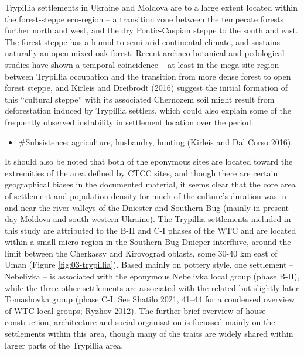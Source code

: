\documentclass[
  12pt,
  a4paper, twoside]{book}
\providecommand{\tightlist}{%
  \setlength{\itemsep}{0pt}\setlength{\parskip}{0pt}}
\begin{document}
Trypillia settlements in Ukraine and Moldova are to a large extent located within the forest-steppe eco-region -- a transition zone between the temperate forests further north and west, and the dry Pontic-Caspian steppe to the south and east. The forest steppe has a humid to semi-arid continental climate, and sustains naturally an open mixed oak forest. Recent archaeo-botanical and pedological studies have shown a temporal coincidence -- at least in the mega-site region -- between Trypillia occupation and the transition from more dense forest to open forest steppe, and Kirleis and Dreibrodt (2016) suggest the initial formation of this ``cultural steppe'' with its associated Chernozem soil might result from deforestation induced by Trypillia settlers, which could also explain some of the frequently observed instability in settlement location over the period.

\begin{itemize}
\tightlist
\item
  \#Subsistence: agriculture, husbandry, hunting (Kirleis and Dal Corso 2016).
\end{itemize}

It should also be noted that both of the eponymous sites are located toward the extremities of the area defined by CTCC sites, and though there are certain geographical biases in the documented material, it seems clear that the core area of settlement and population density for much of the culture's duration was in and near the river valleys of the Dniester and Southern Bug (mainly in present-day Moldova and south-western Ukraine). The Trypillia settlements included in this study are attributed to the B-II and C-I phases of the WTC and are located within a small micro-region in the Southern Bug-Dnieper interfluve, around the limit between the Cherkassy and Kirovograd oblasts, some 30-40 km east of Uman (Figure \ref{fig:03-trypillia}). Based mainly on pottery style, one settlement -- Nebelivka -- is associated with the eponymous Nebelivka local group (phase B-II), while the three other settlements are associated with the related but slightly later Tomashovka group (phase C-I. See Shatilo 2021, 41--44 for a condensed overview of WTC local groups; Ryzhov 2012). The further brief overview of house construction, architecture and social organisation is focussed mainly on the settlements within this area, though many of the traits are widely shared within larger parts of the Trypillia area.
\end{document}
